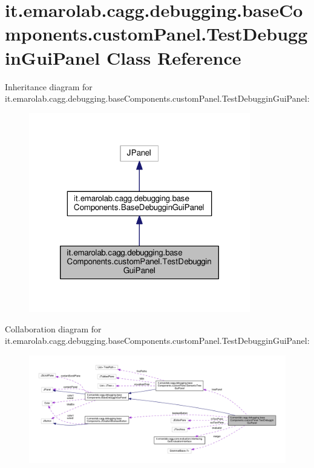 \hypertarget{classit_1_1emarolab_1_1cagg_1_1debugging_1_1baseComponents_1_1customPanel_1_1TestDebugginGuiPanel}{\section{it.\-emarolab.\-cagg.\-debugging.\-base\-Components.\-custom\-Panel.\-Test\-Debuggin\-Gui\-Panel Class Reference}
\label{classit_1_1emarolab_1_1cagg_1_1debugging_1_1baseComponents_1_1customPanel_1_1TestDebugginGuiPanel}
}


Inheritance diagram for it.\-emarolab.\-cagg.\-debugging.\-base\-Components.\-custom\-Panel.\-Test\-Debuggin\-Gui\-Panel\-:\nopagebreak
\begin{figure}[H]
\begin{center}
\leavevmode
\includegraphics[width=274pt]{classit_1_1emarolab_1_1cagg_1_1debugging_1_1baseComponents_1_1customPanel_1_1TestDebugginGuiPanel__inherit__graph}
\end{center}
\end{figure}


Collaboration diagram for it.\-emarolab.\-cagg.\-debugging.\-base\-Components.\-custom\-Panel.\-Test\-Debuggin\-Gui\-Panel\-:\nopagebreak
\begin{figure}[H]
\begin{center}
\leavevmode
\includegraphics[width=350pt]{classit_1_1emarolab_1_1cagg_1_1debugging_1_1baseComponents_1_1customPanel_1_1TestDebugginGuiPanel__coll__graph}
\end{center}
\end{figure}
